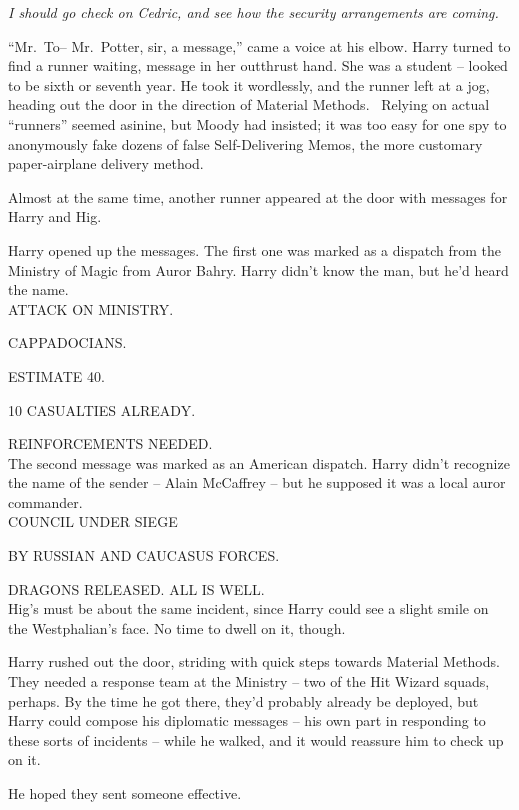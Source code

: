\emph{I should go check on Cedric, and see how the security arrangements
are coming.}

``Mr.~To-- Mr.~Potter, sir, a message,'' came a voice at his elbow.
Harry turned to find a runner waiting, message in her outthrust hand.
She was a student -- looked to be sixth or seventh year. He took it
wordlessly, and the runner left at a jog, heading out the door in the
direction of Material Methods. ~Relying on actual ``runners'' seemed
asinine, but Moody had insisted; it was too easy for one spy to
anonymously fake dozens of false Self-Delivering Memos, the more
customary paper-airplane delivery method.

Almost at the same time, another runner appeared at the door with
messages for Harry and Hig.

Harry opened up the messages. The first one was marked as a dispatch
from the Ministry of Magic from Auror Bahry. Harry didn't know the man,
but he'd heard the name.\\

ATTACK ON MINISTRY.

CAPPADOCIANS.

ESTIMATE 40.

10 CASUALTIES ALREADY.

REINFORCEMENTS NEEDED.\\

The second message was marked as an American dispatch. Harry didn't
recognize the name of the sender -- Alain McCaffrey -- but he supposed
it was a local auror commander.\\

COUNCIL UNDER SIEGE

BY RUSSIAN AND CAUCASUS FORCES.

DRAGONS RELEASED. ALL IS WELL.\\

Hig's must be about the same incident, since Harry could see a slight
smile on the Westphalian's face. No time to dwell on it, though.

Harry rushed out the door, striding with quick steps towards Material
Methods. They needed a response team at the Ministry -- two of the Hit
Wizard squads, perhaps. By the time he got there, they'd probably
already be deployed, but Harry could compose his diplomatic messages --
his own part in responding to these sorts of incidents -- while he
walked, and it would reassure him to check up on it.

He hoped they sent someone effective.

